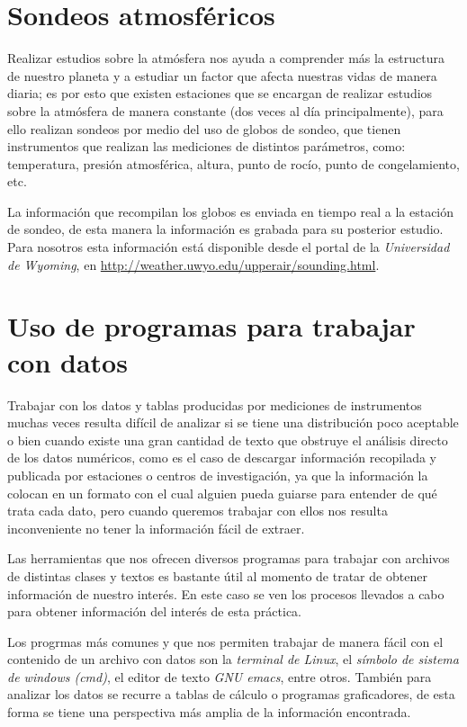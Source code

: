 \documentclass[12pt]{article}
\begin{document}
\section{Sondeos atmosféricos}

Realizar estudios sobre la atmósfera nos ayuda a comprender más la estructura de nuestro planeta y a estudiar un factor que afecta nuestras vidas de manera diaria; es por esto que existen estaciones que se encargan de realizar estudios sobre la atmósfera de manera constante (dos veces al día principalmente), para ello realizan sondeos por medio del uso de globos de sondeo, que tienen instrumentos que realizan las mediciones de distintos parámetros, como: temperatura, presión atmosférica, altura, punto de rocío, punto de congelamiento, etc.

La información que recompilan los globos es enviada en tiempo real a la estación de sondeo, de esta manera la información es grabada para su posterior estudio. Para nosotros esta información está disponible desde el portal de la \textit{Universidad de Wyoming}, en \url{http://weather.uwyo.edu/upperair/sounding.html}.

\section{Uso de programas para trabajar con datos}
Trabajar con los datos y tablas producidas por mediciones de instrumentos muchas veces resulta difícil de analizar si se tiene una distribución poco aceptable o bien cuando existe una gran cantidad de texto que obstruye el análisis directo de los datos numéricos, como es el caso de descargar información recopilada y publicada por estaciones o centros de investigación, ya que la información la colocan en un formato con el cual alguien pueda guiarse para entender de qué trata cada dato, pero cuando queremos trabajar con ellos nos resulta inconveniente no tener la información fácil de extraer.

Las herramientas que nos ofrecen diversos programas para trabajar con archivos de distintas clases y textos es bastante útil al momento de tratar de obtener información de nuestro interés. En este caso se ven los procesos llevados a cabo para obtener información del interés de esta práctica. 

Los progrmas más comunes y que nos permiten trabajar de manera fácil con el contenido de un archivo con datos son la \textit{terminal de Linux}, el \textit{símbolo de sistema de windows (cmd)}, el editor de texto \textit{GNU emacs}, entre otros. También para analizar los datos se recurre a tablas de cálculo o programas graficadores, de esta forma se tiene una perspectiva más amplia de la información encontrada.
\end{document}
